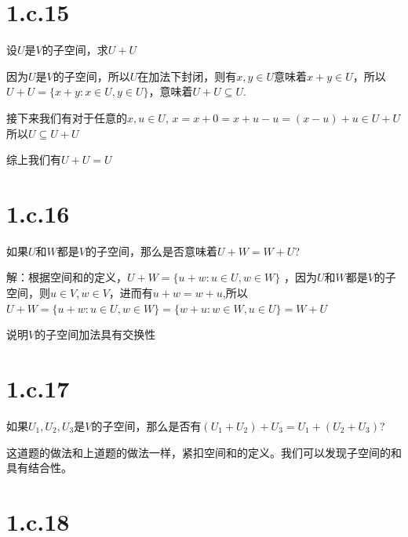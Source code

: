 \documentclass[10pt,a4paper,UTF8]{article}
\begin{document}
\section*{1.c.15}
\label{sec:orgc9163f6}


\begin{problem}
设\(U\)是\(V\)的子空间，求\(U+U\)
\end{problem}

\begin{answer}
因为\(U\)是\(V\)的子空间，所以\(U\)在加法下封闭，则有\(x,y\in U\)意味着\(x+y \in U\)，所以\(U + U = \{x +y :x\in U, y\in U\}\)，意味着\(U + U \subseteq U\).

接下来我们有对于任意的\(x,u\in U\), \(x = x+0 = x+u -u = (x-u) + u \in U+U\) 所以\(U\subseteq U+U\)

综上我们有\(U + U = U\)
\end{answer}
\section*{1.c.16}
\label{sec:orga2eaaa2}


\begin{problem}
如果\(U\)和\(W\)都是\(V\)的子空间，那么是否意味着\(U+W = W+U\)?
\end{problem}

\begin{answer}
解：根据空间和的定义，\(U+W=\{u+w:u\in U,w\in W\}\) ，因为\(U\)和\(W\)都是\(V\)的子空间，则\(u\in V,w\in V\)，进而有\(u+w = w+u\),所以\(U+W=\{u+w:u\in U,w\in W\}=\{w+u:w\in W,u\in U\} = W+U\)

说明\(V\)的子空间加法具有交换性
\end{answer}
\section*{1.c.17}
\label{sec:orga1dd50f}


\begin{problem}
如果\(U_{1},U_{2},U_{3}\)是\(V\)的子空间，那么是否有\((U_{1} + U_{2}) + U_{3} = U_{1} + (U_{2} + U_{3})\)?
\end{problem}

\begin{answer}
这道题的做法和上道题的做法一样，紧扣空间和的定义。我们可以发现子空间的和具有结合性。
\end{answer}
\section*{1.c.18}
\label{sec:org78f2cf7}
\end{document}
